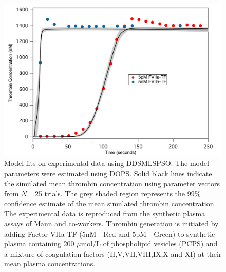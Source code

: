 \documentclass[12pt]{article}
\begin{document}
\begin{figure}[h]
\centering
\includegraphics[width=1.0\textwidth]{./figs/Figure_4_Sim_Train_E1_E5.pdf}
\caption{Model fits on experimental data using DDSMLSPSO. The model parameters were estimated using DOPS. Solid black lines indicate the simulated mean thrombin concentration using parameter vectors from $N$= 25 trials. The grey shaded region represents the 99\% confidence estimate of the mean simulated thrombin concentration. The experimental data is reproduced from the synthetic plasma assays of Mann and co-workers. Thrombin generation is initiated by adding Factor VIIa-TF (5nM - Red and 5pM - Green) to synthetic plasma containing 200 $\mu$mol/L of phospholipid vesicles (PCPS) and a mixture of coagulation factors (II,V,VII,VIII,IX,X and XI) at their mean plasma concentrations.
}\label{fig-train}
\end{figure}

\clearpage
\end{document}
